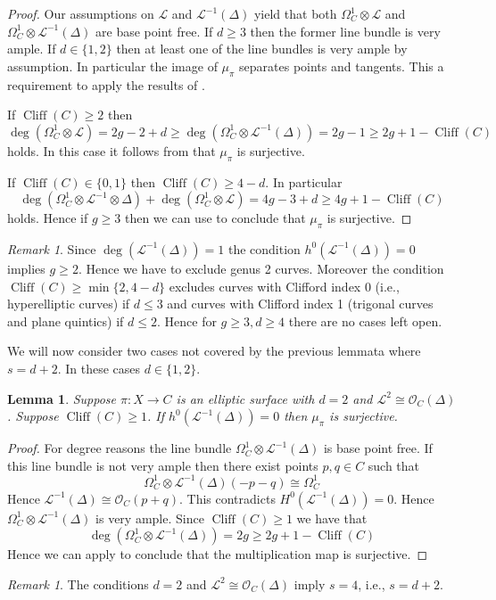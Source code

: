 \documentclass{amsart}
\newcommand{\cL}{\mathcal{L}}
\newcommand{\cO}{\mathcal{O}}
\newtheorem{lemma}[theorem]{Lemma}
\theoremstyle{definition}
\theoremstyle{remark}
\newtheorem{remark}[theorem]{Remark}
\DeclareMathOperator{\Cliff}{Cliff}
\begin{document}
 \begin{proof}
Our assumptions on $\cL$ and $\cL^{-1}(\Delta)$ yield that both  $\Omega^1_C\otimes \cL$ and $\Omega_C^1\otimes \cL^{-1}(\Delta)$ are base point free. If $d\geq 3$ then the former line bundle is very ample. If $d\in \{1,2\}$ then at least one of the line bundles is very ample by assumption. In particular the image of $\mu_{\pi}$ separates points and tangents. This a requirement to apply the results of \cite{ButMult}.

If $\Cliff(C)\geq 2$ then
\[\deg(\Omega_C^1\otimes \cL)=2g-2+d\geq \deg(\Omega_C^1\otimes \cL^{-1}(\Delta))=2g-1\geq 2g+1-\Cliff(C)\]
holds. In this case it follows from \cite[Theorem 1]{ButMult}  that $\mu_\pi$ is  surjective.

If $\Cliff(C)\in \{0,1\}$ then $\Cliff(C)\geq 4-d$. 
In particular
\[ \deg(\Omega^1_C\otimes \cL^{-1}\otimes\Delta)+\deg(\Omega^1_C\otimes \cL) =4g-3+d \geq 4g+1-\Cliff(C)\]
holds. Hence if $g\geq 3$ then we can use \cite[Theorem 2]{ButMult} to conclude that $\mu_\pi$ is surjective.
\end{proof}

\begin{remark}
Since $\deg (\cL^{-1}(\Delta))=1$ the condition $h^0(\cL^{-1}(\Delta))=0$ implies $g\geq 2$. Hence we have to exclude genus 2 curves. Moreover the condition $\Cliff(C)\geq \min \{2, 4-d\}$ excludes curves with Clifford index $0$ (i.e., hyperelliptic curves) if $d\leq 3$ and curves with Clifford index 1 (trigonal curves and plane quintics) if $d\leq 2$. Hence for $g\geq 3, d\geq 4$ there are no  cases left open.
\end{remark}

We will now consider two cases not covered by the previous lemmata where $s=d+2$. In these cases $d\in \{1,2\}$.

\begin{lemma}  \label{lemKosVanC} Suppose $\pi: X\to C$ is an elliptic surface with $d=2$ and $\cL^2\cong \cO_C(\Delta)$. Suppose $\Cliff(C)\geq 1$. If $h^0(\cL^{-1}(\Delta))=0$ then $\mu_\pi$ is surjective.
\end{lemma}

\begin{proof}
For degree reasons the line bundle $\Omega^1_C\otimes \cL^{-1}(\Delta)$ is base point free. If this line bundle is not very ample then there exist points $p,q\in C$ such that
\[ \Omega_C^1\otimes \cL^{-1}(\Delta)(-p-q)\cong \Omega_C^1\]
Hence $\cL^{-1}(\Delta)\cong \cO_C(p+q)$. This contradicts $H^0(\cL^{-1}(\Delta))=0$. Hence $\Omega_C^1\otimes \cL^{-1}(\Delta)$ is very ample.
Since $\Cliff(C)\geq 1$ we have that 
\[ \deg(\Omega_C^1\otimes \cL^{-1}(\Delta))=2g\geq 2g+1-\Cliff(C)\]
Hence we can apply \cite[Theorem 1]{GreenLaz} to conclude that the multiplication map is surjective.
\end{proof}
\begin{remark}
The conditions $d=2$ and $\cL^2\cong \cO_C(\Delta)$ imply $s=4$, i.e., $s=d+2$.
\end{remark}
\end{document}
